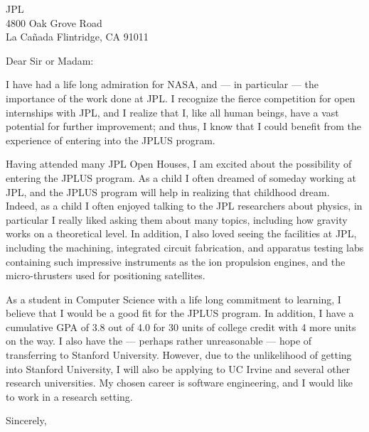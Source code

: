 \documentclass[letter]{letter}
\begin{document}
\begin{letter}{JPL \\ 4800 Oak Grove Road \\ La Ca\~nada Flintridge, CA 91011}
\opening{Dear Sir or Madam:}
  
I have had a life long admiration for NASA, and --- in particular ---
the importance of the work done at JPL.  I recognize the fierce
competition for open internships with JPL, and I realize that I, like
all human beings, have a vast potential for further improvement; and
thus, I know that I could benefit from the experience of entering into
the JPLUS program.

Having attended many JPL Open Houses, I am excited about the possibility
of entering the JPLUS program.  As a child I often dreamed of someday
working at JPL, and the JPLUS program will help in realizing that
childhood dream.  Indeed, as a child I often enjoyed talking to the JPL
researchers about physics, in particular I really liked asking them
about many topics, including how gravity works on a theoretical level.
In addition, I also loved seeing the facilities at JPL, including the
machining, integrated circuit fabrication, and apparatus testing labs
containing such impressive instruments as the ion propulsion engines,
and the micro-thrusters used for positioning satellites.

As a student in Computer Science with a life long commitment to
learning, I believe that I would be a good fit for the JPLUS program.
In addition, I have a cumulative GPA of 3.8 out of 4.0 for 30 units of
college credit with 4 more units on the way.  I also have the ---
perhaps rather unreasonable --- hope of transferring to Stanford
University.  However, due to the unlikelihood of getting into Stanford
University, I will also be applying to UC Irvine and several other
research universities.  My chosen career is software engineering, and I
would like to work in a research setting.

\closing{\hfill Sincerely,}
\end{letter}
\end{document}
